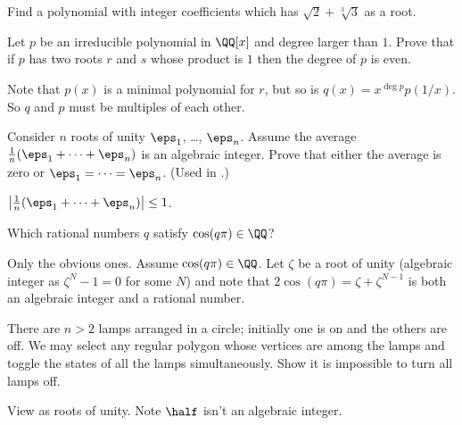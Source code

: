 \section{\problemhead}

\begin{problem}
	Find a polynomial with integer coefficients
	which has $\sqrt2+\sqrt[3]{3}$ as a root.
\end{problem}

\begin{problem}
	[Brazil 2006]
	\gim
	Let $p$ be an irreducible polynomial in $\QQ[x]$
	and degree larger than $1$.
	Prove that if $p$ has two roots $r$ and $s$ whose product is $1$
	then the degree of $p$ is even.
	\begin{hint}
		Note that $p(x)$ is a minimal polynomial for $r$,
		but so is $q(x) = x^{\deg p} p(1/x)$.
		So $q$ and $p$ must be multiples of each other.
	\end{hint}
\end{problem}

\begin{sproblem}
	\label{prob:rep_lemma}
	Consider $n$ roots of unity $\eps_1$, \dots, $\eps_n$.
	Assume the average $\frac1n(\eps_1 + \dots + \eps_n)$ is an algebraic integer.
	Prove that either the average is zero or $\eps_1 = \dots = \eps_n$.
	(Used in .)
	\begin{hint}
		$\left\lvert \frac 1n(\eps_1 + \dots + \eps_n) \right\rvert \le 1$.
	\end{hint}
\end{sproblem}

\begin{dproblem}
	\gim
	Which rational numbers $q$ satisfy $\cos(q\pi) \in \QQ$?
	\begin{hint}
		Only the obvious ones.
		Assume $\cos(q\pi) \in \QQ$.
		Let $\zeta$ be a root of unity (algebraic integer
		as $\zeta^N-1 = 0$ for some $N$)
		and note that $2\cos(q\pi) = \zeta + \zeta^{N-1}$
		is both an algebraic integer and a rational number.
	\end{hint}
\end{dproblem}

\begin{problem}
	[MOP 2010]
	There are $n > 2$ lamps arranged in a circle;
	initially one is on and the others are off.
	We may select any regular polygon whose vertices are among the lamps
	and toggle the states of all the lamps simultaneously.
	Show it is impossible to turn all lamps off.
	\begin{hint}
		View as roots of unity. Note $\half$ isn't an algebraic integer.
	\end{hint}
\end{problem}

